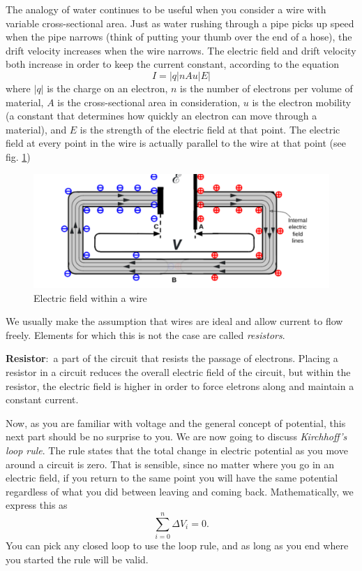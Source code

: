 \documentclass[nobib]{tufte-handout}
\newcommand{\defn}[2]{\noindent\textbf{#1}:\ #2}
\begin{document}
The analogy of water continues to be useful when you consider a wire with variable 
cross-sectional area. Just as water rushing through a pipe picks up speed when the pipe 
narrows (think of putting your thumb over the end of a hose), the drift velocity
increases when the wire narrows. 
The electric field and drift velocity both increase in order to keep 
the current constant, according to the equation 
\[I = |q|nAu|E|\]
where $|q|$ is the charge on an electron, $n$ is the number of electrons per 
volume of material, $A$ is the cross-sectional area in consideration, 
$u$ is the electron mobility (a constant that determines how quickly 
an electron can move through a material), and $E$ is the strength of the electric field
at that point. The electric field at every point in the wire is actually parallel 
to the wire at that point (see fig. \ref{fig:efww})
\begin{figure}
    \center
    \caption{Electric field within a wire}
    \label{fig:efww}
    \includegraphics{images/eflineswire.png}
\end{figure}

We usually make the assumption that wires
are ideal and allow current to flow 
freely. Elements for which this is not 
the case are called \emph{resistors}. 

\defn{Resistor}{a part of the circuit that resists 
the passage of electrons.}
Placing a resistor in a circuit reduces 
the overall electric field of the circuit, 
but within the resistor, the electric field is higher 
in order to force eletrons along and maintain a 
constant current. 

Now, as you are familiar with voltage and the general
concept of potential, this next part should be no surprise to you.
We are now going to discuss \emph{Kirchhoff's loop rule}. 
The rule states that the total change in electric potential 
as you move around a circuit is zero. That is sensible, 
since no matter where you go in an electric field, if you return 
to the same point you will have the same potential 
regardless of what you did between leaving and coming back. 
Mathematically, we express this as 
\[\sum_{i=0}^n \Delta V_i = 0.\]
You can pick any closed loop to use the loop rule, 
and as long as you end where you started the rule will be valid.
\end{document}
